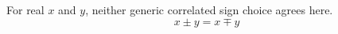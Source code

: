 \documentclass{article}
\begin{document}
For real $x$ and $y$, neither generic correlated sign choice agrees here.
\begin{equation}
  x \pm y = x \mp y
\end{equation}
\end{document}
